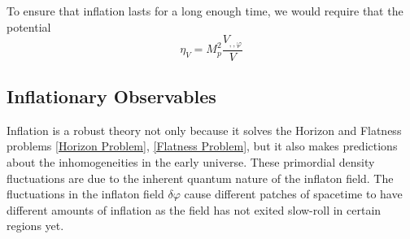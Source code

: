 \documentclass[aps,prd,reprint,preprintnumbers,showpacs,floatfix,nofootinbib,superscript address]{revtex4-2}
\begin{document}

To ensure that inflation lasts for a long enough time, we would require that the potential 
\begin{equation}
    \eta_V = M_p^2  \frac{V_{,,\varphi}}{V} 
\end{equation}
\subsection{Inflationary Observables} \label{Inflationary Observables}
Inflation is a robust theory not only because it solves the Horizon and Flatness problems \ref{Horizon Problem}, \ref{Flatness Problem}, but it also makes predictions about the inhomogeneities in the early universe. These primordial density fluctuations are due to the inherent quantum nature of the inflaton field. 
The fluctuations in the inflaton field $\delta\varphi$ cause different patches of spacetime to have different amounts of inflation as the field has not exited slow-roll in certain regions yet. 
\end{document}
